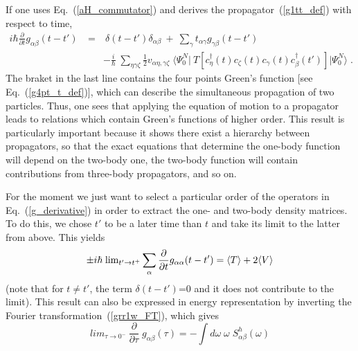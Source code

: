 If one uses Eq.~(\ref{aH_commutator}) and derives the propagator~(\ref{g1tt_def}) with respect to time,
\begin{eqnarray}
 i\hbar \frac{\partial}{\partial t}g_{\alpha \beta}(t - t') 
    ~&=&~ \delta(t - t') \delta_{\alpha \beta} ~+~
          \sum_\gamma t_{\alpha \gamma} g_{\gamma \beta}(t - t')
 \nonumber \\
 & & - \frac{i}{\hbar} \;  \sum_{\eta \gamma \zeta} \frac{1}{2} v_{\alpha \eta , \gamma \zeta}
   \; \langle \Psi^N_0 \vert
             ~T [ c^{\dag}_\eta(t) c_\zeta(t) c_\gamma(t) 
                 c^{\dag}_\beta(t') ]
              \vert \Psi^N_0 \rangle \;   .  \qquad  \quad
\label{g_derivative}
\end{eqnarray}
The braket in the last line contains the four points Green's function [see Eq.~(\ref{g4pt_t_def})], which can describe the simultaneous propagation of two particles. Thus, one sees that applying the equation of motion to a propagator leads to relations which contain Green's functions of higher order. This result is particularly important because it shows there exist a hierarchy between propagators, so that the exact equations that determine the one-body function will depend on the two-body one, the two-body function will contain contributions from three-body propagators, and so on.

For the moment we just want to select a particular order of the operators in
Eq.~(\ref{g_derivative}) in order to extract the one- and two-body density
matrices. To do this, we chose $t'$ to be a later time than $t$ and take its
limit to the latter from above. This yields 
\begin{equation}
 \pm i\hbar \;  \hbox{lim}_{t' \rightarrow t^+} \sum_\alpha \frac{\partial}{\partial t}g_{\alpha \alpha}(t - t') =
 \langle T \rangle + 2 \langle V \rangle  
\label{lim_T_2V}
\end{equation}
 (note that for $t \neq t'$, the term $\delta(t - t')$=0 and it does not contribute to the limit).
This result can also be expressed in energy representation by inverting the Fourier transformation~(\ref{grr1w_FT}), which gives
\begin{equation}
  lim_{\tau\rightarrow  0^-} ~  \frac{\partial}{\partial \tau} \; g_{\alpha \beta}(\tau)
     = - \int d\omega \; \omega \; S^h_{\alpha \beta}(\omega)
\end{equation}


